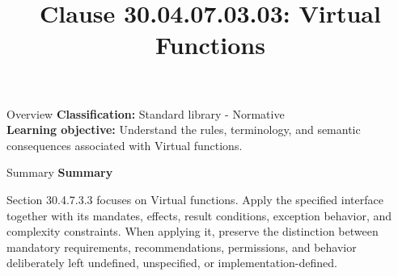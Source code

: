 \documentclass[10pt,letterpaper]{article}
\title{Clause 30.04.07.03.03: Virtual Functions}
\author{}
\date{}
\begin{document}
\maketitle
\begin{CornellOverviewBox}{Overview}
\textbf{Classification:} Standard library - Normative\\[2pt]
\textbf{Learning objective:} Understand the rules, terminology, and semantic consequences associated with Virtual functions.
\end{CornellOverviewBox}\begin{CornellSummaryBox}{Summary}
{\sffamily\bfseries\color{Accent} Summary}\par\vspace{3pt}Section 30.4.7.3.3 focuses on Virtual functions. Apply the specified interface together with its mandates, effects, result conditions, exception behavior, and complexity constraints. When applying it, preserve the distinction between mandatory requirements, recommendations, permissions, and behavior deliberately left undefined, unspecified, or implementation-defined.
\end{CornellSummaryBox}
\end{document}
